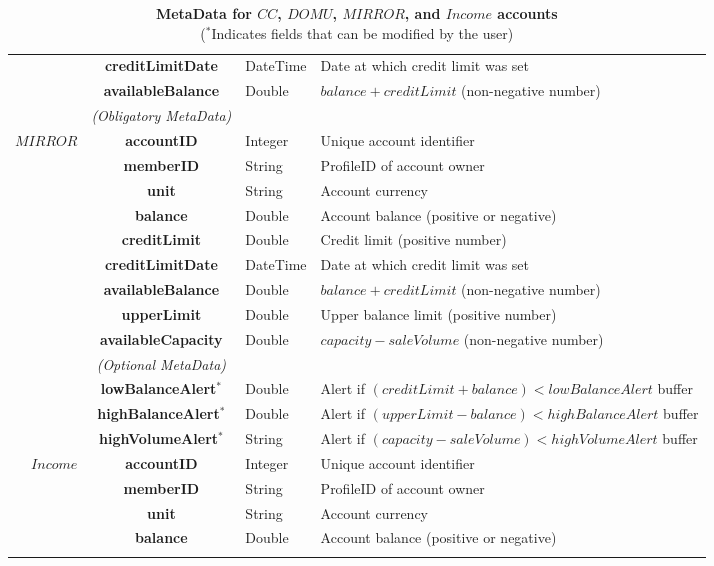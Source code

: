 \begin{table}[H]
\begin{centering}
{\begin{tabular}{ r | c | l | l }
			& {\bf creditLimitDate}		&DateTime & Date at which credit limit was set \\
			& {\bf availableBalance}		&Double	& $balance + creditLimit$ (non-negative number) \\
\Xhline{1.5pt}
			 & \emph{(Obligatory MetaData)}& & \\
\cline{2-2}
$MIRROR$ 	& {\bf accountID}			&Integer	& Unique account identifier \\
			& {\bf memberID}			&String	& ProfileID of account owner \\
			& {\bf unit}					&String	& Account currency \\
			& {\bf balance}				&Double	& Account balance (positive or negative) \\
			& {\bf creditLimit}			&Double	& Credit limit (positive number) \\
			& {\bf creditLimitDate}		&DateTime & Date at which credit limit was set \\
			& {\bf availableBalance}		&Double	& $balance + creditLimit$ (non-negative number) \\
			& {\bf upperLimit}			&Double	& Upper balance limit (positive number) \\
			& {\bf availableCapacity}		&Double	& $capacity - saleVolume$ (non-negative number) \\
\cline{2-2}
			 & \emph{(Optional MetaData)}& & \\
\cline{2-2}
			& {\bf lowBalanceAlert$^*$}		&Double	& Alert if $(creditLimit + balance) < lowBalanceAlert$ buffer \\
			& {\bf highBalanceAlert$^*$}		&Double	& Alert if $(upperLimit - balance) < highBalanceAlert$ buffer \\
			& {\bf highVolumeAlert$^*$}		&String	& Alert if $(capacity - saleVolume) < highVolumeAlert$ buffer \\
\Xhline{1.5pt}
$Income$ 		& {\bf accountID}			&Integer	& Unique account identifier \\
			& {\bf memberID}			&String	& ProfileID of account owner \\
			& {\bf unit}					&String	& Account currency \\
			& {\bf balance}				&Double	& Account balance (positive or negative) \\
\Xhline{1.5pt}
\end{tabular}
}
\caption{\small\textbf{MetaData for $CC$, $DOMU$, $MIRROR$, and $Income$ accounts}\\
($^*$Indicates fields that can be modified by the user)}
\label{tab:AccountMetaData1}
\end{centering}
\end{table}

